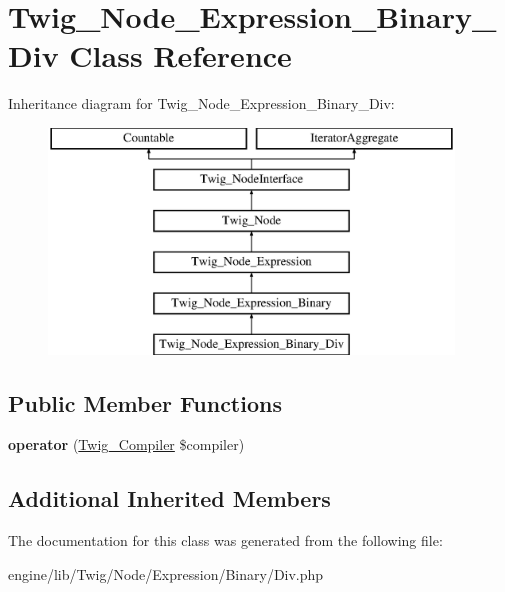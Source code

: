\hypertarget{class_twig___node___expression___binary___div}{}\section{Twig\+\_\+\+Node\+\_\+\+Expression\+\_\+\+Binary\+\_\+\+Div Class Reference}
\label{class_twig___node___expression___binary___div}
Inheritance diagram for Twig\+\_\+\+Node\+\_\+\+Expression\+\_\+\+Binary\+\_\+\+Div\+:\begin{figure}[H]
\begin{center}
\leavevmode
\includegraphics[height=6.000000cm]{class_twig___node___expression___binary___div}
\end{center}
\end{figure}
\subsection*{Public Member Functions}
\begin{DoxyCompactItemize}
\item 
\hypertarget{class_twig___node___expression___binary___div_af77318ec88d5f8a508684970a150b670}{}{\bfseries operator} (\hyperlink{class_twig___compiler}{Twig\+\_\+\+Compiler} \$compiler)\label{class_twig___node___expression___binary___div_af77318ec88d5f8a508684970a150b670}

\end{DoxyCompactItemize}
\subsection*{Additional Inherited Members}


The documentation for this class was generated from the following file\+:\begin{DoxyCompactItemize}
\item 
engine/lib/\+Twig/\+Node/\+Expression/\+Binary/Div.\+php\end{DoxyCompactItemize}
